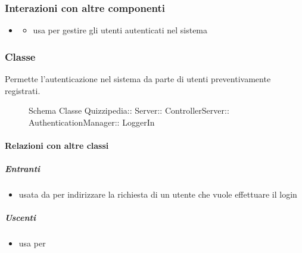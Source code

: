 \subsubsection{Interazioni con altre componenti}
\begin{itemize}
\item {}
\begin{itemize}
\item usa  per gestire gli utenti autenticati nel sistema
\end{itemize}
\end{itemize}
\subsubsection{Classe }
Permette l'autenticazione nel sistema da parte di utenti preventivamente registrati.
\begin{figure}[H]
\centering
\noindent{}
\caption[Schema Classe LoggerIn]{Schema Classe Quizzipedia:: Server:: ControllerServer:: AuthenticationManager:: LoggerIn}
\end{figure}
\paragraph{Relazioni con altre classi}
\subparagraph{Entranti}
\begin{itemize}
\item usata da  per indirizzare la richiesta di un utente che vuole effettuare il login
\end{itemize}
\subparagraph{Uscenti}
\begin{itemize}
\item usa  per 
\end{itemize}
